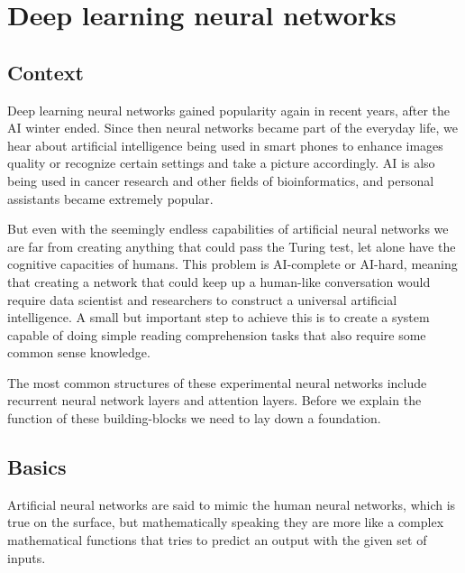 \chapter*{Deep learning neural networks}
\section{Context}
Deep learning neural networks gained popularity again in recent years, after the AI winter ended. Since then neural networks became part of the everyday life, we hear about artificial intelligence being used in smart phones to enhance images quality or recognize certain settings and take a picture accordingly. AI is also being used in cancer research and other fields of bioinformatics, and personal assistants became extremely popular.

But even with the seemingly endless capabilities of artificial neural networks we are far from creating anything that could pass the Turing test, let alone have the cognitive capacities of humans. This problem is AI-complete or AI-hard, meaning that creating a network that could keep up a human-like conversation would require data scientist and researchers to construct a universal artificial intelligence. A small but important step to achieve this is to create a system capable of doing simple reading comprehension tasks that also require some common sense knowledge.

The most common structures of these experimental neural networks include recurrent neural network layers and attention layers. Before we explain the function of these building-blocks we need to lay down a foundation.

\section{Basics}
Artificial neural networks are said to mimic the human neural networks, which is true on the surface, but mathematically speaking they are more like a complex mathematical functions that tries to predict an output with the given set of inputs.
